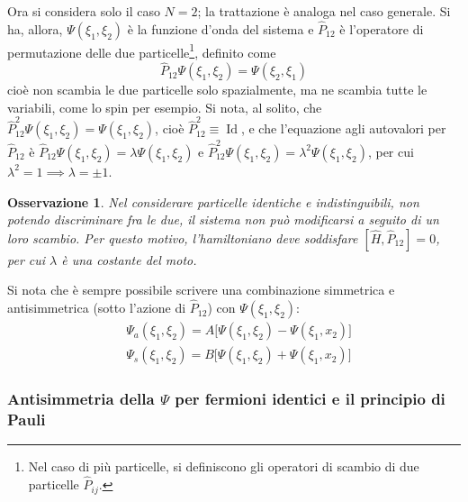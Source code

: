 \documentclass[11pt, a4paper]{scrartcl}
\theoremstyle{style}
\newtheorem{osservazione}{Osservazione}[section]
\numberwithin{equation}{subsection}
\begin{document}
Ora si considera solo il caso $N=2$; la trattazione \`e analoga nel caso generale.
Si ha, allora, $\Psi (\xi _1, \xi _2)$ \`e la funzione d'onda del sistema e $\hat{P}_{12}$ \`e l'operatore di permutazione delle due particelle\footnote{Nel caso di pi\`u particelle, si definiscono gli operatori di scambio di due particelle $\hat{P}_{ij}$.}, definito come
\[
\hat{P}_{12} \Psi(\xi _1, \xi _2) = \Psi(\xi _2,\xi _1)
\] 
cio\`e non scambia le due particelle solo spazialmente, ma ne scambia tutte le variabili, come lo spin per esempio.
Si nota, al solito, che $\hat{P}_{12}^2 \Psi(\xi _1,\xi _2) = \Psi (\xi _1,\xi _2)$, cio\`e $\hat{P}_{12}^2 \equiv \operatorname{Id} $, e che l'equazione agli autovalori per $\hat{P}_{12}$ \`e $\hat{P}_{12} \Psi (\xi _1,\xi _2) = \lambda  \Psi(\xi _1,\xi _2)$ e $\hat{P}_{12}^2 \Psi(\xi _1,\xi _2) = \lambda ^2 \Psi(\xi _1,\xi _2)$, per cui $\lambda ^2 = 1 \implies  \lambda  = \pm 1$.
\begin{osservazione}
	Nel considerare particelle identiche \textit{e indistinguibili}, non potendo discriminare fra le due, il sistema non pu\`o modificarsi a seguito di un loro scambio. 
	Per questo motivo, l'hamiltoniano deve soddisfare $[\hat{H}, \hat{P}_{12}] = 0$, per cui $\lambda $ \`e una costante del moto. 
\end{osservazione}

\noindent Si nota che \`e sempre possibile scrivere una combinazione simmetrica e antisimmetrica (sotto l'azione di $\hat{P}_{12}$) con $\Psi (\xi _1,\xi _2)$:
\begin{align}
	& \Psi_a(\xi _1,\xi _2) = A \Big[ \Psi(\xi _1,\xi _2) - \Psi (\xi _1,x_2) \Big]  \tag{antisimmetrica}\\
	& \Psi_s(\xi _1,\xi _2) = B \Big[ \Psi(\xi _1,\xi _2) + \Psi (\xi _1,x_2) \Big]  \tag{simmetrica}
\end{align}

\subsubsection{Antisimmetria della $\Psi$ per fermioni identici e il principio di Pauli}
\end{document}
